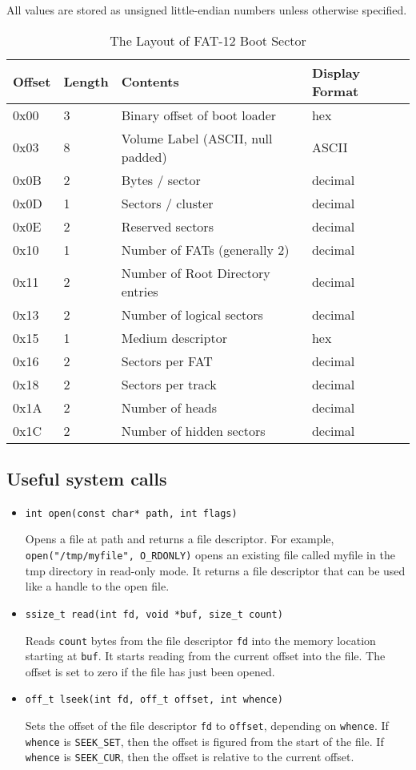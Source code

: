 \documentclass[letterpaper,10pt]{article}
\begin{document}
All values are stored as unsigned little-endian numbers unless otherwise specified.
\begin{table}[ht]
\centering
\begin{tabular}{|l|l|l|l|}
\hline
Offset & Length & Contents & Display Format \\ \hline
0x00 & 3 & Binary offset of boot loader & hex \\
0x03 & 8 & Volume Label (ASCII, null padded) & ASCII \\
0x0B & 2 & Bytes / sector & decimal \\
0x0D & 1 & Sectors / cluster & decimal \\
0x0E & 2 & Reserved sectors & decimal \\
0x10 & 1 & Number of FATs (generally 2) & decimal \\
0x11 & 2 & Number of Root Directory entries & decimal \\
0x13 & 2 & Number of logical sectors & decimal \\
0x15 & 1 & Medium descriptor & hex \\
0x16 & 2 & Sectors per FAT & decimal \\
0x18 & 2 & Sectors per track & decimal \\
0x1A & 2 & Number of heads & decimal \\
0x1C & 2 & Number of hidden sectors & decimal \\
\hline 
\end{tabular}
\caption{The Layout of FAT-12 Boot Sector}
\label{Bootsector}
\end{table}

\subsection{Useful system calls}
\begin{itemize}
 \item \verb=int open(const char* path, int flags)=

Opens a file at path and returns a file descriptor. For example, 
\verb+open("/tmp/myfile", O_RDONLY)+ opens an existing file called myfile in the tmp directory in read-only mode.
It returns a file descriptor that can be used like a handle to the open file.

 \item \verb=ssize_t read(int fd, void *buf, size_t count)=

Reads \verb+count+ bytes from the file descriptor \verb+fd+ into the memory location starting at \verb+buf+. It
starts reading from the current offset into the file. The offset is set to zero if the file has
just been opened.

 \item \verb=off_t lseek(int fd, off_t offset, int whence)=

Sets the offset of the file descriptor \verb+fd+ to \verb+offset+, depending on \verb+whence+. If \verb+whence+ is
\verb+SEEK_SET+, then the offset is figured from the start of the file. If \verb+whence+ is \verb+SEEK_CUR+,
then the offset is relative to the current offset.

\end{itemize}
\end{document}
